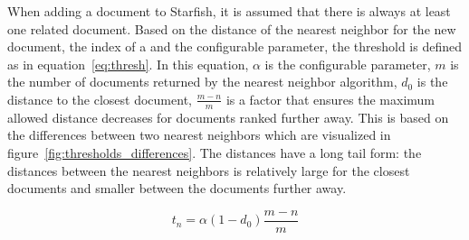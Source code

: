 When adding a document to Starfish, it is assumed that there is always at least one related document. Based on the distance of the nearest neighbor for the new document, the index of a and the configurable parameter, the threshold is defined as in equation~\ref{eq:thresh}. In this equation, $\alpha$ is the configurable parameter, $m$ is the number of documents returned by the nearest neighbor algorithm, $d_0$ is the distance to the closest document, $\frac{m - n}{m}$ is a factor that ensures the maximum allowed distance decreases for documents ranked further away. This is based on the differences between two nearest neighbors which are visualized in figure~\ref{fig:thresholds_differences}. The distances have a long tail form: the distances between the nearest neighbors is relatively large for the closest documents and smaller between the documents further away. 

\begin{equation}
t_n = \alpha (1 - d_0) \frac{m - n}{m}
\label{eq:thresh}
\end{equation}
